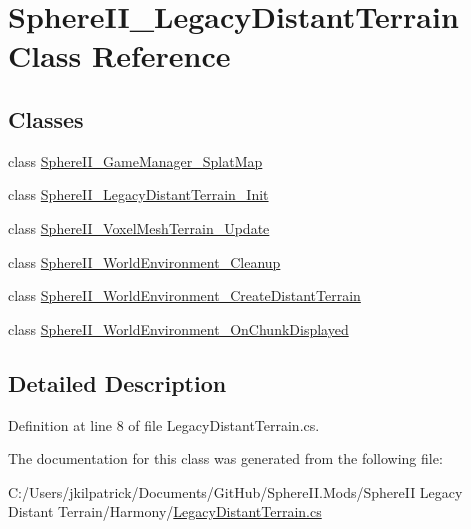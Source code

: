 \hypertarget{class_sphere_i_i___legacy_distant_terrain}{}\section{Sphere\+I\+I\+\_\+\+Legacy\+Distant\+Terrain Class Reference}
\label{class_sphere_i_i___legacy_distant_terrain}
\subsection*{Classes}
\begin{DoxyCompactItemize}
\item 
class \mbox{\hyperlink{class_sphere_i_i___legacy_distant_terrain_1_1_sphere_i_i___game_manager___splat_map}{Sphere\+I\+I\+\_\+\+Game\+Manager\+\_\+\+Splat\+Map}}
\item 
class \mbox{\hyperlink{class_sphere_i_i___legacy_distant_terrain_1_1_sphere_i_i___legacy_distant_terrain___init}{Sphere\+I\+I\+\_\+\+Legacy\+Distant\+Terrain\+\_\+\+Init}}
\item 
class \mbox{\hyperlink{class_sphere_i_i___legacy_distant_terrain_1_1_sphere_i_i___voxel_mesh_terrain___update}{Sphere\+I\+I\+\_\+\+Voxel\+Mesh\+Terrain\+\_\+\+Update}}
\item 
class \mbox{\hyperlink{class_sphere_i_i___legacy_distant_terrain_1_1_sphere_i_i___world_environment___cleanup}{Sphere\+I\+I\+\_\+\+World\+Environment\+\_\+\+Cleanup}}
\item 
class \mbox{\hyperlink{class_sphere_i_i___legacy_distant_terrain_1_1_sphere_i_i___world_environment___create_distant_terrain}{Sphere\+I\+I\+\_\+\+World\+Environment\+\_\+\+Create\+Distant\+Terrain}}
\item 
class \mbox{\hyperlink{class_sphere_i_i___legacy_distant_terrain_1_1_sphere_i_i___world_environment___on_chunk_displayed}{Sphere\+I\+I\+\_\+\+World\+Environment\+\_\+\+On\+Chunk\+Displayed}}
\end{DoxyCompactItemize}


\subsection{Detailed Description}


Definition at line 8 of file Legacy\+Distant\+Terrain.\+cs.



The documentation for this class was generated from the following file\+:\begin{DoxyCompactItemize}
\item 
C\+:/\+Users/jkilpatrick/\+Documents/\+Git\+Hub/\+Sphere\+I\+I.\+Mods/\+Sphere\+I\+I Legacy Distant Terrain/\+Harmony/\mbox{\hyperlink{_legacy_distant_terrain_8cs}{Legacy\+Distant\+Terrain.\+cs}}\end{DoxyCompactItemize}
